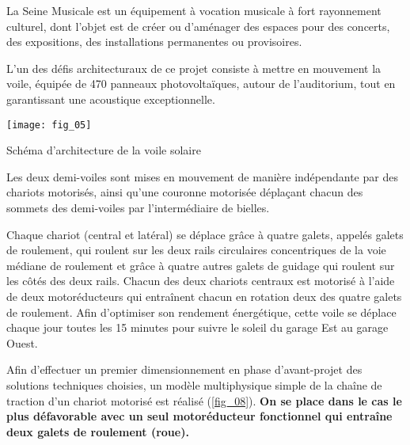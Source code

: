 \ifprof
\else
La Seine Musicale est un équipement à vocation musicale à fort rayonnement culturel, dont l’objet est de créer
ou d’aménager des espaces pour des concerts, des expositions, des installations permanentes ou provisoires.


L’un des défis architecturaux de ce projet consiste à mettre en mouvement la voile, %
équipée de 470 panneaux photovoltaïques, autour de l’auditorium, tout en garantissant une acoustique exceptionnelle.

%

\begin{marginfigure}
\texttt{[image: fig\_05]}
\caption{Schéma d’architecture de la voile solaire \label{fig_05}}
\end{marginfigure}

Les deux demi-voiles sont mises en mouvement de manière indépendante par des chariots motorisés, ainsi qu’une couronne motorisée déplaçant chacun des sommets des demi-voiles par l’intermédiaire
de bielles. 

Chaque chariot (central et latéral) se déplace grâce à quatre galets, appelés galets de roulement, qui roulent
sur les deux rails circulaires concentriques de la voie médiane de roulement et grâce à quatre autres galets de
guidage qui roulent sur les côtés des deux rails. Chacun des deux chariots centraux est motorisé à l’aide de deux
motoréducteurs qui entraînent chacun en rotation deux des quatre galets de roulement.
Afin d’optimiser son rendement énergétique, cette voile se déplace chaque jour toutes les 15 minutes pour suivre
le soleil du garage Est au garage Ouest.%

Afin d’effectuer un premier dimensionnement en phase d’avant-projet des solutions
techniques choisies, un modèle multiphysique simple de la chaîne de traction d’un chariot motorisé est réalisé
(\autoref{fig_08}).
\textbf{On se place dans le cas le plus défavorable avec un seul motoréducteur fonctionnel qui entraîne
deux galets de roulement (roue).}


